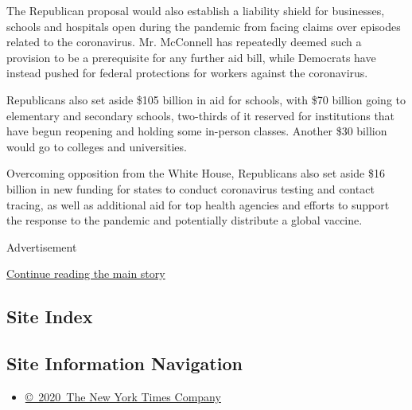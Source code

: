 The Republican proposal would also establish a liability shield for
businesses, schools and hospitals open during the pandemic from facing
claims over episodes related to the coronavirus. Mr. McConnell has
repeatedly deemed such a provision to be a prerequisite for any further
aid bill, while Democrats have instead pushed for federal protections
for workers against the coronavirus.

Republicans also set aside \$105 billion in aid for schools, with \$70
billion going to elementary and secondary schools, two-thirds of it
reserved for institutions that have begun reopening and holding some
in-person classes. Another \$30 billion would go to colleges and
universities.

Overcoming opposition from the White House, Republicans also set aside
\$16 billion in new funding for states to conduct coronavirus testing
and contact tracing, as well as additional aid for top health agencies
and efforts to support the response to the pandemic and potentially
distribute a global vaccine.

Advertisement

\protect\hyperlink{after-bottom}{Continue reading the main story}

\hypertarget{site-index}{%
\subsection{Site Index}\label{site-index}}

\hypertarget{site-information-navigation}{%
\subsection{Site Information
Navigation}\label{site-information-navigation}}

\begin{itemize}
\tightlist
\item
  \href{https://help.nytimes3xbfgragh.onion/hc/en-us/articles/115014792127-Copyright-notice}{©~2020~The
  New York Times Company}
\end{itemize}


